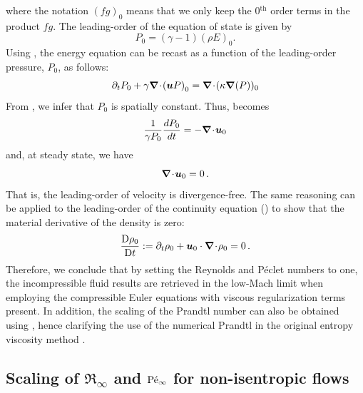 %
where the notation $(fg)_0$ means that we only keep the 0$^{\text{th}}$ order terms in the product $fg$. The leading-order of the equation of state is given by 
\begin{equation}
\label{eq:leading_order_eos}
 P_0 = (\gamma - 1) (\rho E)_0 .
\end{equation}
%
Using , the energy equation can be recast as a function of the leading-order pressure, $P_0$, as follows:
%
\begin{equation}\label{eq:asympt_equ3_ener}
 \partial_t P_0 + \gamma \boldsymbol{\nabla}\! \cdot \! \left( \boldsymbol u P \right)_0 =  \boldsymbol{\nabla}\! \cdot \!(\kappa \boldsymbol{\nabla}(P))_0
\end{equation}
%
From , we infer that $P_0$ is spatially constant. Thus,  becomes
%
\begin{equation}
\frac{1}{\gamma P_0} \frac{d P_0}{dt} = - \boldsymbol{\nabla}\! \cdot \! \boldsymbol u_0 
\end{equation}
%
and, at steady state, we have
%
\begin{equation}
 \boldsymbol{\nabla}\! \cdot \!  \boldsymbol u_0 = 0 \, .
\end{equation}
%
That is, the leading-order of velocity is divergence-free. The same reasoning can be applied to the leading-order of the continuity equation () to show that the material derivative of the density is zero:
\begin{equation}
\frac{\textrm{D} \rho_0}{\textrm{D} t} := \partial_t \rho_0 + \boldsymbol u_0 \cdot \boldsymbol{\nabla}\! \cdot \! \rho_0 = 0 \, .
\end{equation}
%
Therefore, we conclude that by setting the Reynolds and P\'eclet numbers to one, the incompressible fluid results are retrieved in the low-Mach limit when employing the compressible Euler equations with viscous regularization terms present. In addition, the scaling of the Prandtl number can also be obtained using , hence clarifying the use of the numerical Prandtl in the original entropy viscosity method \cite{jlg1}.

\subsection{Scaling of $\Re_\infty$ and $\textrm{P\'e}_\infty$ for non-isentropic flows} \label{sec:nonisentropic}

